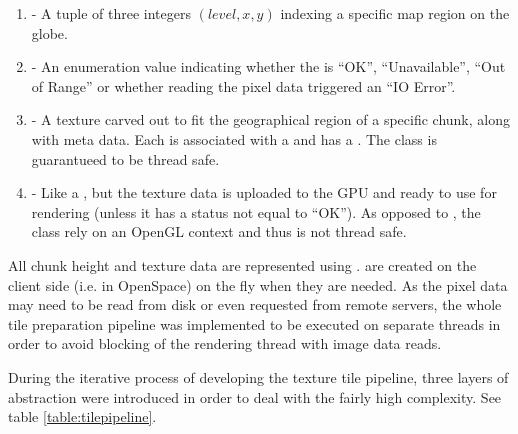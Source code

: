 \begin{enumerate}
	\item \textbf{} - A tuple of three integers $(level, x, y)$ indexing a specific map region on the globe.
    \item \textbf{} - An enumeration value indicating whether the  is ``OK'', ``Unavailable'', ``Out of Range'' or whether reading the pixel data triggered an ``IO Error''.
	\item \textbf{} - A texture carved out to fit the geographical region of a specific chunk, along with meta data. Each  is associated with a  and has a . The  class is guarantueed to be thread safe.
	\item \textbf{} - Like a , but the texture data is uploaded to the GPU and ready to use for rendering (unless it has a status not equal to ``OK''). As opposed to , the  class rely on an OpenGL context and thus is not thread safe.
\end{enumerate}

All chunk height and texture data are represented using .  are created on the client side (i.e. in OpenSpace) on the fly when they are needed. As the pixel data may need to be read from disk or even requested from remote servers, the whole tile preparation pipeline was implemented to be executed on separate threads in order to avoid blocking of the rendering thread with image data reads. 

During the iterative process of developing the texture tile pipeline, three layers of abstraction were introduced in order to deal with the fairly high complexity. See table \ref{table:tilepipeline}.

\begin{center}
  \begin{table}[!htbp]
  \caption[]{Abstraction layers used in the texture data pipeline}
    \label{table:tilepipeline}
  \end{table}
\end{center}

